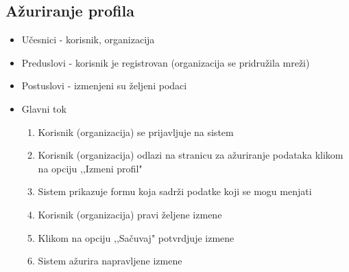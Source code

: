 \subsection{Ažuriranje profila}
\begin{itemize}
\item Učesnici - korisnik, organizacija
\item Preduslovi - korisnik je registrovan (organizacija se pridružila mreži)
\item Postuslovi - izmenjeni su željeni podaci
\item Glavni tok
\begin{enumerate}
\item Korisnik (organizacija) se prijavljuje na sistem
\item Korisnik (organizacija) odlazi na stranicu za ažuriranje podataka klikom na opciju ,,Izmeni profil"
\item Sistem prikazuje formu koja sadrži podatke koji se mogu menjati
\item Korisnik (organizacija) pravi željene izmene
\item Klikom na opciju ,,Sačuvaj" potvrdjuje izmene
\item Sistem ažurira napravljene izmene
\end{enumerate}
\end{itemize}